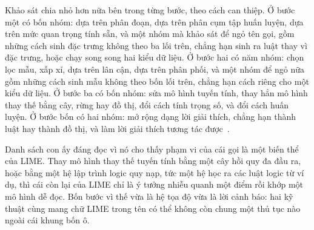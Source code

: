 Khảo sát chia nhỏ hơn nữa bên trong từng bước, theo cách can thiệp. Ở bước một
có bốn nhóm: dựa trên phân đoạn, dựa trên phân cụm tập huấn luyện, dựa trên mức
quan trọng tính sẵn, và một nhóm mà khảo sát để ngỏ tên gọi, gồm những cách sinh
đặc trưng không theo ba lối trên, chẳng hạn sinh ra luật thay vì đặc trưng, hoặc
chạy song song hai kiểu dữ liệu. Ở bước hai có năm nhóm: chọn lọc mẫu, xấp xỉ,
dựa trên lân cận, dựa trên phân phối, và một nhóm để ngỏ nữa gồm những cách sinh
mẫu không theo bốn lối trên, chẳng hạn cách riêng cho một kiểu dữ liệu. Ở bước ba có bốn nhóm: sửa mô hình tuyến tính,
thay hẳn mô hình thay thế bằng cây, rừng hay đồ thị, đổi cách tính trọng số, và
đổi cách huấn luyện. Ở bước bốn có hai nhóm: mở rộng dạng lời giải thích, chẳng
hạn thành luật hay thành đồ thị, và làm lời giải thích tương tác
được~\autocite{p22whichlime}.

Danh sách con ấy đáng đọc vì nó cho thấy phạm vi của cái gọi là một biến thể của
LIME. Thay mô hình thay thế tuyến tính bằng một cây hồi quy đa đầu ra, hoặc bằng
một hệ lập trình logic quy nạp, tức một hệ học ra các luật logic từ ví dụ, thì
cái còn lại của LIME chỉ là ý tưởng nhiễu
quanh một điểm rồi khớp một mô hình dễ đọc. Bốn bước vì thế vừa là hệ tọa
độ vừa là lời cảnh báo: hai kỹ thuật cùng mang chữ LIME trong tên có thể không
còn chung một thủ tục nào ngoài cái khung bốn ô.
